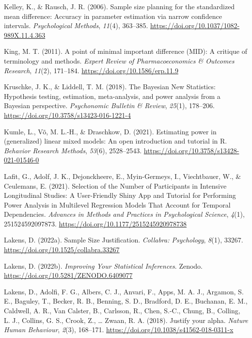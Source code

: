 \documentclass[
  man,
  floatsintext,
  longtable,
  a4paper,
  nolmodern,
  notxfonts,
  notimes,
  colorlinks=true,linkcolor=blue,citecolor=blue,urlcolor=blue]{apa7}
\newlength{\cslhangindent}
\newenvironment{CSLReferences}[2] %
 {\begin{list}{}{%
  \setlength{\itemindent}{0pt}
  \setlength{\leftmargin}{0pt}
  \setlength{\parsep}{0pt}
  \ifodd #1
   \setlength{\leftmargin}{\cslhangindent}
   \setlength{\itemindent}{-1\cslhangindent}
  \fi
  \setlength{\itemsep}{#2\baselineskip}}}
 {\end{list}}
\begin{document}
\begin{CSLReferences}{1}{0}
Kelley, K., \& Rausch, J. R. (2006). Sample size planning for the
standardized mean difference: {Accuracy} in parameter estimation via
narrow confidence intervals. \emph{Psychological Methods}, \emph{11}(4),
363--385. \url{https://doi.org/10.1037/1082-989X.11.4.363}

King, M. T. (2011). A point of minimal important difference ({MID}): A
critique of terminology and methods. \emph{Expert Review of
Pharmacoeconomics \& Outcomes Research}, \emph{11}(2), 171--184.
\url{https://doi.org/10.1586/erp.11.9}

Kruschke, J. K., \& Liddell, T. M. (2018). The {Bayesian New
Statistics}: {Hypothesis} testing, estimation, meta-analysis, and power
analysis from a {Bayesian} perspective. \emph{Psychonomic Bulletin \&
Review}, \emph{25}(1), 178--206.
\url{https://doi.org/10.3758/s13423-016-1221-4}

Kumle, L., Võ, M. L.-H., \& Draschkow, D. (2021). Estimating power in
(generalized) linear mixed models: {An} open introduction and tutorial
in {R}. \emph{Behavior Research Methods}, \emph{53}(6), 2528--2543.
\url{https://doi.org/10.3758/s13428-021-01546-0}

Lafit, G., Adolf, J. K., Dejonckheere, E., Myin-Germeys, I.,
Viechtbauer, W., \& Ceulemans, E. (2021). Selection of the {Number} of
{Participants} in {Intensive Longitudinal Studies}: {A User-Friendly
Shiny App} and {Tutorial} for {Performing Power Analysis} in {Multilevel
Regression Models That Account} for {Temporal Dependencies}.
\emph{Advances in Methods and Practices in Psychological Science},
\emph{4}(1), 251524592097873.
\url{https://doi.org/10.1177/2515245920978738}

Lakens, D. (2022a). Sample {Size Justification}. \emph{Collabra:
Psychology}, \emph{8}(1), 33267.
\url{https://doi.org/10.1525/collabra.33267}

Lakens, D. (2022b). \emph{Improving {Your Statistical Inferences}}.
Zenodo. \url{https://doi.org/10.5281/ZENODO.6409077}

Lakens, D., Adolfi, F. G., Albers, C. J., Anvari, F., Apps, M. A. J.,
Argamon, S. E., Baguley, T., Becker, R. B., Benning, S. D., Bradford, D.
E., Buchanan, E. M., Caldwell, A. R., Van Calster, B., Carlsson, R.,
Chen, S.-C., Chung, B., Colling, L. J., Collins, G. S., Crook, Z.,
\ldots{} Zwaan, R. A. (2018). Justify your alpha. \emph{Nature Human
Behaviour}, \emph{2}(3), 168--171.
\url{https://doi.org/10.1038/s41562-018-0311-x}


\end{CSLReferences}
\end{document}
